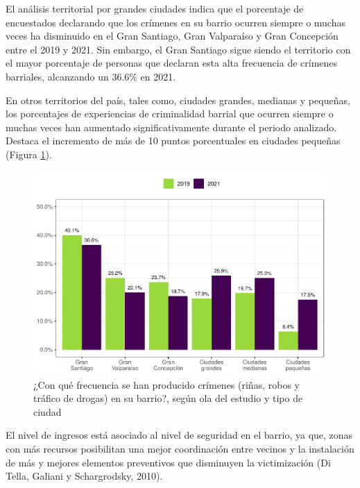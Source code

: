 \documentclass[
  12pt,
]{book}
\begin{document}
El análisis territorial por grandes ciudades indica que el porcentaje de encuestados declarando que los crímenes en su barrio ocurren siempre o muchas veces ha disminuido en el Gran Santiago, Gran Valparaíso y Gran Concepción entre el 2019 y 2021. Sin embargo, el Gran Santiago sigue siendo el territorio con el mayor porcentaje de personas que declaran esta alta frecuencia de crímenes barriales, alcanzando un 36.6\% en 2021.

En otros territorios del país, tales como, ciudades grandes, medianas y pequeñas, los porcentajes de experiencias de criminalidad barrial que ocurren siempre o muchas veces han aumentado significativamente durante el periodo analizado. Destaca el incremento de más de 10 puntos porcentuales en ciudades pequeñas (Figura \ref{fig:crim-estrato}).

\begin{figure}

{\centering \includegraphics{reporte-elsoc_files/figure-latex/crim-estrato-1} 

}

\caption{¿Con qué frecuencia se han producido crímenes (riñas, robos y tráfico de drogas) en su barrio?, según ola del estudio y tipo de ciudad}\label{fig:crim-estrato}
\end{figure}

El nivel de ingresos está asociado al nivel de seguridad en el barrio, ya que, zonas con más recursos posibilitan una mejor coordinación entre vecinos y la instalación de más y mejores elementos preventivos que disminuyen la victimización (Di Tella, Galiani y Schargrodsky, 2010).
\end{document}

